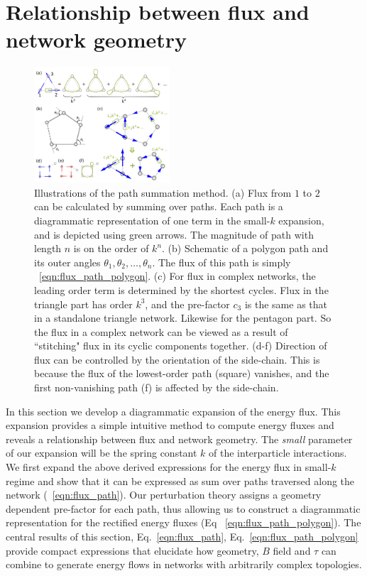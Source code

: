 \documentclass[
 preprint,
 preprintnumbers,
 amsmath,amssymb,
 aps,
 pre,
 longbibliography,
 superscriptaddress,
 10pt, twocolumn
]{revtex4-1}
\begin{document}
\section{Relationship between flux and network geometry} \label{sec:path}
\begin{figure}[ht]
	\centering
	\includegraphics[width=0.45\textwidth]{4_path_sum.pdf}
    \caption{Illustrations of the path summation method.
    (a) Flux from $1$ to $2$ can be calculated by summing over paths. Each path is a diagrammatic representation of one term in the small-$k$ expansion, and is depicted using green arrows. The magnitude of path with length $n$ is on the order of $k^n$.
    (b) Schematic of a polygon path and its outer angles $\theta_1,\theta_2,\dots,\theta_n$. The flux of this path is simply \eqnname~\eqref{eqn:flux_path_polygon}.
    (c) For flux in complex networks, the leading order term is determined by the shortest cycles. Flux in the triangle part has order $k^3$, and the pre-factor $c_3$ is the same as that in a standalone triangle network. Likewise for the pentagon part. So the flux in a complex network can be viewed as a result of ``stitching" flux in its cyclic components together.
    (d-f) Direction of flux can be controlled by the orientation of the side-chain. This is because the flux of the lowest-order path (square) vanishes, and the first non-vanishing path (f) is affected by the side-chain.
    }
    \label{fig:path_sum}
\end{figure}

In this section we develop a diagrammatic expansion of the energy flux. This expansion provides a simple intuitive method to compute energy fluxes and reveals a relationship between flux and network geometry. The {\it{small}} parameter of our expansion will be the spring constant $k$ of the interparticle interactions. We first expand the above derived expressions for the energy flux in small-$k$ regime and show that it can be expressed as sum over paths traversed along the network (\eqnname~\eqref{eqn:flux_path}). Our perturbation theory assigns a geometry dependent pre-factor for each path, thus allowing us to construct a diagrammatic representation for the rectified energy fluxes (Eq \eqnname~\eqref{eqn:flux_path_polygon}). The central results of this section, Eq.~\ref{eqn:flux_path}, Eq.~\ref{eqn:flux_path_polygon} provide compact expressions that elucidate how geometry, $B$ field and $\tau$ can combine to generate energy flows in networks with arbitrarily complex topologies. 
\end{document}
